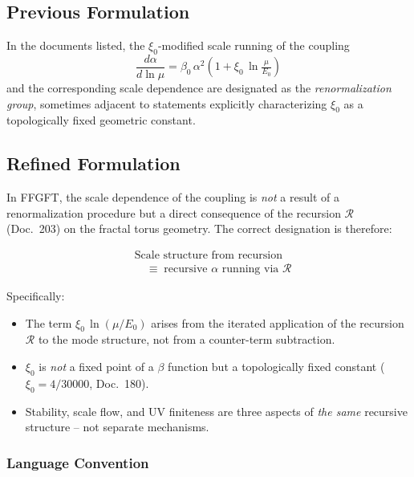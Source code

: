 \subsection*{Previous Formulation}

In the documents listed, the $\xi_0$-modified scale running of the
coupling
\begin{equation}
  \frac{d\alpha}{d\ln\mu}
  = \beta_0\,\alpha^2\!\left(1 + \xi_0\,\ln\tfrac{\mu}{E_0}\right)
  \tag{old -- imprecise}
\end{equation}
and the corresponding scale dependence are designated as the
\emph{renormalization group}, sometimes adjacent to statements
explicitly characterizing $\xi_0$ as a topologically fixed
geometric constant.

\subsection*{Refined Formulation}

In FFGFT, the scale dependence of the coupling is \emph{not} a result
of a renormalization procedure but a direct consequence of the
recursion $\mathcal{R}$ (Doc.~203) on the fractal torus geometry.
The correct designation is therefore:

\begin{equation}
  \boxed{\;
  \begin{aligned}
    &\text{Scale structure from recursion} \\
    &\quad\equiv\; \text{recursive $\alpha$ running via $\mathcal{R}$}
  \end{aligned}
  \;}
  \tag{190.12}
\end{equation}

Specifically:
\begin{itemize}
  \item The term $\xi_0\,\ln(\mu/E_0)$ arises from the iterated
        application of the recursion $\mathcal{R}$ to the mode
        structure, not from a counter-term subtraction.
  \item $\xi_0$ is \emph{not} a fixed point of a $\beta$ function
        but a topologically fixed constant
        ($\xi_0 = 4/30000$, Doc.~180).
  \item Stability, scale flow, and UV finiteness are three aspects
        of \emph{the same} recursive structure -- not separate
        mechanisms.
\end{itemize}

\subsubsection*{Language Convention}

